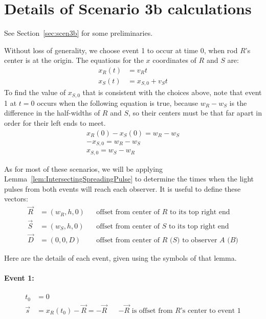 \documentclass[a4paper]{article}
\theoremstyle{plain}
\theoremstyle{definition}
\newcommand{\vect}[1]{\vec{#1}}
\begin{document}
\section{Details of Scenario 3b calculations}
\label{app:scen3b}

See Section~\ref{sec:scen3b} for some preliminaries.

Without loss of generality, we choose event 1 to occur at time 0, when
rod $R$'s center is at the origin.  The equations for the $x$
coordinates of $R$ and $S$ are:
\begin{align*}
  x_R(t) & = v_R t \\
  x_S(t) & = x_{S,0} + v_S t
\end{align*}
To find the value of $x_{S,0}$ that is consistent with the choices
above, note that event 1 at $t=0$ occurs when the following equation
is true, because $w_R - w_S$ is the difference in the half-widths of
$R$ and $S$, so their centers must be that far apart in order for
their left ends to meet.
\begin{align*}
x_R(0) - x_S(0) = w_R - w_S \\
-x_{S,0} = w_R - w_S \\
x_{S,0} = w_S - w_R
\end{align*}

As for most of these scenarios, we will be applying
Lemma~\ref{lem:IntersectingSpreadingPulse} to determine the times when
the light pulses from both events will reach each observer.
It is useful to define these vectors:
\begin{align}
\vect{R} & = (w_R, h, 0) & & \text{offset from center of $R$ to its top right end} \\
\vect{S} & = (w_S, h, 0) & & \text{offset from center of $S$ to its top right end} \\
\vect{D} & = (0, 0, D) & & \text{offset from center of $R$ ($S$) to observer $A$ ($B$)}
\end{align}

Here are the details of each event, given using the symbols of that
lemma.


\paragraph{Event 1:}

\begin{align}
t_0 & = 0 \\
\vect{s} & = x_R(t_0) - \vect{R} = -\vect{R} & & \text{$-\vect{R}$ is offset from $R$'s center to event 1}
\end{align}
\end{document}
